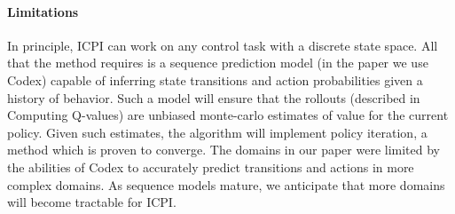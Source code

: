 \documentclass{article}
\begin{document}
\paragraph{Limitations} In principle, ICPI can work on any control task with a
discrete state space. All that the method requires is a sequence prediction
model (in the paper we use Codex) capable of inferring state transitions and
action probabilities given a history of behavior. Such a model will ensure that
the rollouts (described in Computing Q-values) are unbiased monte-carlo
estimates of value for the current policy. Given such estimates, the algorithm
will implement policy iteration, a method which is proven to converge. The
domains in our paper were limited by the abilities of Codex to accurately
predict transitions and actions in more complex domains. As sequence models
mature, we anticipate that more domains will become tractable for ICPI.
\end{document}
